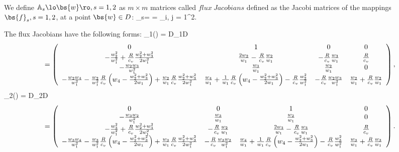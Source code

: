 \paragraph{}
We define $\mathbb{A}_s\lo \bs{w} \ro, s = 1, 2$ as $ m \times m$ matrices called $flux\ Jacobians$ defined as the Jacobi matrices of the mappings $\bs{f}_s, s = 1, 2$, at a point $\bs{w}\in D$:
\be
{}_s\lo{}\ro =  = \lo{}\ro_{i, j = 1}^{2}.
\ee

The flux Jacobians have the following forms:
\be
\nonumber
  _1({}) = {D{}_1\over D {}}
\ee
\scriptsize
\begin{eqnarray}
\nonumber
= \left( \begin{array}{cccc} 0 & 1 & 0 & 0\\ -{w_2^2\over w_1^2} +{R\over c_v}{w_2^2+w_3^2\over 2 w_1^2} & {2w_2\over w_1}-{R\over c_v}{w_2\over w_1} & -{R\over c_v}{w_3\over w_1} & {R\over c_v}\\ -{w_2w_3\over w_1^2} & {w_3\over w_1} & {w_2\over w_1} & 0 \\ -{w_2w_4\over w_1^2}-{w_2\over w_1^2}{R\over c_v} \left(w_4-{w_2^2+w_3^2\over 2 w_1}\right) +{w_2\over w_1}{R\over c_v}{w_2^2+w_3^2\over 2 w_1^2} & {w_4\over w_1}+{1\over w_1}{R\over c_v} \left(w_4-{w_2^2+w_3^2\over 2 w_1}\right) -{R\over c_v}{w_2^2\over w_1^2} & -{R\over c_v}{w_2w_3\over w_1^2} & {w_2\over w_1}+{R\over c_v}{w_2\over w_1} \\ \end{array} \right),
\end{eqnarray}
\normalsize
\be
\nonumber
{}_2({}) = {D{}_2\over D {}}
\ee
\scriptsize
\begin{eqnarray}
\nonumber
= \left( \begin{array}{cccc} 0 & 0 & 1 & 0\\ -{w_3w_2\over w_1^2} & {w_3\over w_1} & {w_2\over w_1} & 0 \\ -{w_3^2\over w_1^2} +{R\over c_v}{w_2^2+w_3^2\over 2 w_1^2} & -{R\over c_v}{w_2\over w_1} & {2w_3\over w_1} -{R\over c_v}{w_3\over w_1} & {R\over c_v}\\ -{w_3w_4\over w_1^2}-{w_3\over w_1^2}{R\over c_v} \left(w_4-{w_2^2+w_3^2\over 2 w_1}\right) +{w_3\over w_1}{R\over c_v}{w_2^2+w_3^2\over 2 w_1^2}& -{R\over c_v}{w_3w_2\over w_1^2} & {w_4\over w_1}+{1\over w_1}{R\over c_v} \left(w_4-{w_2^2+w_3^2\over 2 w_1}\right) -{R\over c_v}{w_3^2\over w_1^2} & {w_3\over w_1}+{R\over c_v}{w_3\over w_1} \\ \end{array} \right).
\end{eqnarray}
\normalsize
